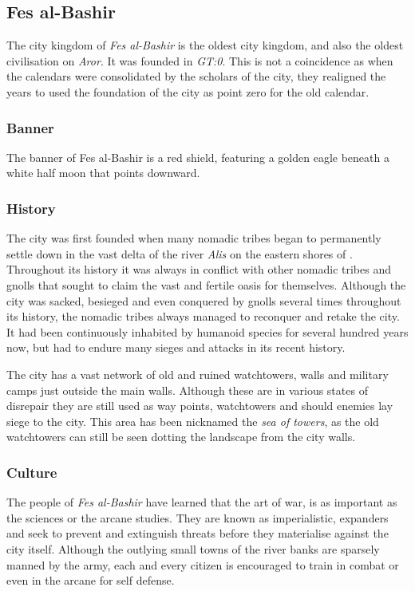 \subsection{Fes al-Bashir}
\label{sec:Fes al-Bashir}

The city kingdom of \emph{Fes al-Bashir} is the oldest city kingdom, and also
the oldest civilisation on \emph{Aror}. It was founded in \emph{GT:0}. This
is not a coincidence as when the calendars were consolidated by the scholars
of the city, they realigned the years to used the foundation of the city as
point zero for the old calendar.

\subsubsection*{Banner}

The banner of Fes al-Bashir is a red shield, featuring a golden eagle beneath
a white half moon that points downward.

\subsubsection*{History}

The city was first founded when many nomadic tribes began to permanently
settle down in the vast delta of the river \emph{Alis} on the eastern shores
of . Throughout its history it was always in conflict with
other nomadic tribes and gnolls that sought to claim the vast and fertile
oasis for themselves. Although the city was sacked, besieged and even
conquered by gnolls several times throughout its history, the nomadic tribes
always managed to reconquer and retake the city. It had been continuously
inhabited by humanoid species for several hundred years now, but had to endure
many sieges and attacks in its recent history.

The city has a vast network of old and ruined watchtowers, walls and military
camps just outside the main walls. Although these are in various states of
disrepair they are still used as way points, watchtowers and should enemies
lay siege to the city. This area has been nicknamed the \emph{sea of towers},
as the old watchtowers can still be seen dotting the landscape from the city
walls.

\subsubsection*{Culture}

The people of \emph{Fes al-Bashir} have learned that the art of war, is as
important as the sciences or the arcane studies. They are known as
imperialistic, expanders and seek to prevent and extinguish threats before
they materialise against the city itself. Although the outlying small towns of
the river banks are sparsely manned by the army, each and every citizen is
encouraged to train in combat or even in the arcane for self defense.

